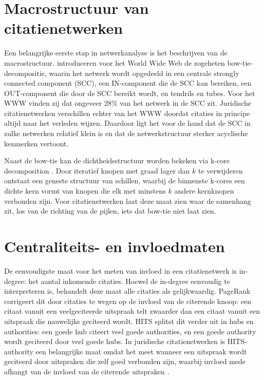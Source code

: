 \documentclass[a4paper, 12pt]{report}
\begin{document}
\section{Macrostructuur van citatienetwerken}
Een belangrijke eerste stap in netwerkanalyse is het beschrijven van de macrostructuur. \textcite{broder2000} introduceren voor het World Wide Web de zogeheten bow-tie-decompositie, waarin het netwerk wordt opgedeeld in een centrale strongly connected component (SCC), een IN-component die de SCC kan bereiken, een OUT-component die door de SCC bereikt wordt, en tendrils en tubes. Voor het WWW vinden zij dat ongeveer 28\% van het netwerk in de SCC zit. Juridische citatienetwerken verschillen echter van het WWW doordat citaties in principe altijd naar het verleden wijzen. Daardoor ligt het voor de hand dat de SCC in zulke netwerken relatief klein is en dat de netwerkstructuur sterker acyclische kenmerken vertoont.

Naast de bow-tie kan de dichtheidsstructuur worden bekeken via k-core decomposition \parencite{carmi2007, seidman1983}. Door iteratief knopen met graad lager dan $k$ te verwijderen ontstaat een geneste structuur van schillen, waarbij de binnenste k-cores een dichte kern vormt van knopen die elk met minstens $k$ andere kernknopen verbonden zijn. Voor citatienetwerken laat deze maat zien waar de samenhang zit, los van de richting van de pijlen, iets dat bow-tie niet laat zien.

\section{Centraliteits- en invloedmaten}

De eenvoudigste maat voor het meten van invloed in een citatienetwerk is in-degree: het aantal inkomende citaties. Hoewel de in-degree eenvoudig te interpreteren is, behandelt deze maat alle citaties als gelijkwaardig. PageRank \parencite{brin1998} corrigeert dit door citaties te wegen op de invloed van de citerende knoop: een citaat vanuit een veelgeciteerde uitspraak telt zwaarder dan een citaat vanuit een uitspraak die nauwelijks geciteerd wordt. HITS \parencite{kleinberg1999} splitst dit verder uit in hubs en authorities: een goede hub citeert veel goede authorities, en een goede authority wordt geciteerd door veel goede hubs. In juridische citatienetwerken is HITS-authority een belangrijke maat omdat het meet wanneer een uitspraak wordt geciteerd door uitspraken die zelf goed verbonden zijn, waarbij invloed mede afhangt van de invloed van de citerende uitspraken \parencite{fowler2008}.
\end{document}
